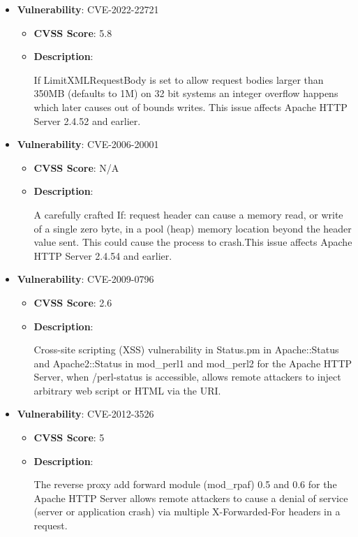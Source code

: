 \documentclass{article}
\begin{document}
\begin{itemize}
        \item \textbf{Vulnerability}: CVE-2022-22721
        \begin{itemize}
            \item \textbf{CVSS Score}:  5.8 
            \item \textbf{Description}:
            \parbox[t]{0.9\linewidth}{
                \ttfamily If LimitXMLRequestBody is set to allow request bodies larger than 350MB (defaults to 1M) on 32 bit systems an integer overflow happens which later causes out of bounds writes. This issue affects Apache HTTP Server 2.4.52 and earlier.
            }
        \end{itemize}
    
        \item \textbf{Vulnerability}: CVE-2006-20001
        \begin{itemize}
            \item \textbf{CVSS Score}:  N/A 
            \item \textbf{Description}:
            \parbox[t]{0.9\linewidth}{
                \ttfamily A carefully crafted If: request header can cause a memory read, or write of a single zero byte, in a pool (heap) memory location beyond the header value sent. This could cause the process to crash.This issue affects Apache HTTP Server 2.4.54 and earlier.
            }
        \end{itemize}
    
        \item \textbf{Vulnerability}: CVE-2009-0796
        \begin{itemize}
            \item \textbf{CVSS Score}:  2.6 
            \item \textbf{Description}:
            \parbox[t]{0.9\linewidth}{
                \ttfamily Cross-site scripting (XSS) vulnerability in Status.pm in Apache::Status and Apache2::Status in mod\_perl1 and mod\_perl2 for the Apache HTTP Server, when /perl-status is accessible, allows remote attackers to inject arbitrary web script or HTML via the URI.
            }
        \end{itemize}
    
        \item \textbf{Vulnerability}: CVE-2012-3526
        \begin{itemize}
            \item \textbf{CVSS Score}:  5 
            \item \textbf{Description}:
            \parbox[t]{0.9\linewidth}{
                \ttfamily The reverse proxy add forward module (mod\_rpaf) 0.5 and 0.6 for the Apache HTTP Server allows remote attackers to cause a denial of service (server or application crash) via multiple X-Forwarded-For headers in a request.
            }
        \end{itemize}
    

\end{itemize}
\end{document}
